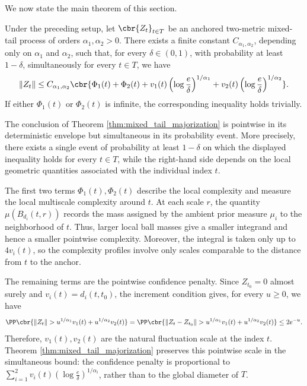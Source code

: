 \documentclass[11pt]{article}
\begin{document}
We now state the main theorem of this section.

\begin{theorem}
\label{thm:mixed_tail_majorization}
Under the preceding setup, let $\cbr{ Z_t}_{t\in T}$ be an anchored
two-metric mixed-tail process of orders $\alpha_1,\alpha_2>0$. There
exists a finite constant $C_{\alpha_1,\alpha_2}$, depending only on
$\alpha_1$ and $\alpha_2$, such that, for every $\delta\in(0,1)$, with
probability at least $1-\delta$, simultaneously for every $t\in T$, we
have
\begin{align*}
\|Z_t\|
\le
C_{\alpha_1,\alpha_2}
\cbr{
\Phi_1(t)+\Phi_2(t)
+v_1(t)
\left(
\log\frac{e}{\delta}
\right)^{1/\alpha_1}
+v_2(t)
\left(
\log\frac{e}{\delta}
\right)^{1/\alpha_2}
}.
\end{align*}
If either $\Phi_1(t)$ or $\Phi_2(t)$ is infinite, the corresponding
inequality holds trivially.
\end{theorem}

The conclusion of Theorem \ref{thm:mixed_tail_majorization} is
pointwise in its deterministic envelope but simultaneous in its
probability event. More precisely, there exists a single event of
probability at least $1-\delta$ on which the displayed inequality holds
for every $t\in T$, while the right-hand side depends on the local
geometric quantities associated with the individual index $t$.

The first two terms $\Phi_1(t), \Phi_2(t)$ describe the local complexity and measure the local multiscale complexity around $t$. At each scale $r$,
the quantity $\mu(B_{d_i}(t,r))$ records the mass assigned by the ambient prior measure $\mu_i$ to the neighborhood of $t$. Thus, larger local ball masses give a smaller integrand and hence a smaller pointwise
complexity. Moreover, the integral is taken only up to $4v_i(t)$, so the complexity profiles involve only scales comparable to the distance from $t$ to the anchor.

The remaining terms are the pointwise confidence penalty. Since
$Z_{t_0}=0$ almost surely and $v_i(t)=d_i(t,t_0)$, the increment
condition gives, for every $u\ge0$, we have
\begin{align*}
\PP\cbr{
\|Z_t\|>u^{1/\alpha_1}v_1(t)+u^{1/\alpha_2}v_2(t)
}=
\PP\cbr{
\|Z_t-Z_{t_0}\|>u^{1/\alpha_1}v_1(t)+u^{1/\alpha_2}v_2(t)
}\le2e^{-u}.
\end{align*}
Therefore, $v_1(t),v_2(t)$ are the natural fluctuation scale at the index $t$.
Theorem \ref{thm:mixed_tail_majorization} preserves this pointwise
scale in the simultaneous bound: the confidence penalty is proportional
to $\sum_{i=1}^2v_i(t)
\left(
\log\frac{e}{\delta}
\right)^{1/\alpha_i}$, rather than to the global diameter of $T$.
\end{document}
